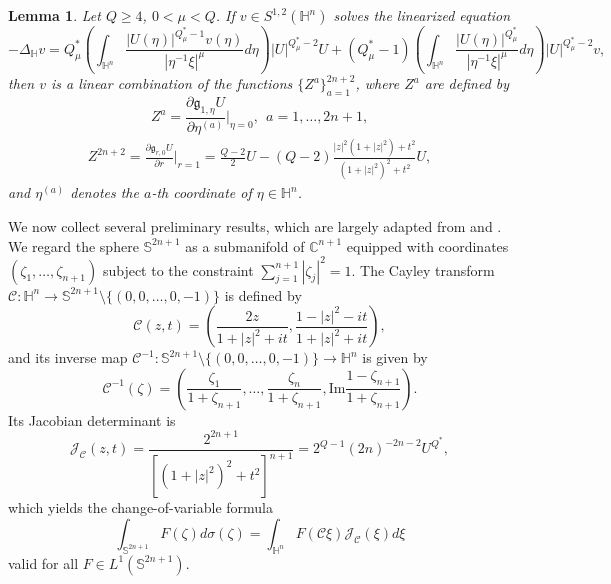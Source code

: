 \documentclass[10pt,a4paper]{amsart}
\newtheorem{lemma}{Lemma}[section]
\begin{document}
\begin{lemma}
 Let $Q\geq 4$, $0<\mu< Q$.
 {If $v \in S^{1,2}(\mathbb{H}^{n})$ solves the linearized equation}
 \begin{equation*}
 -\Delta_{\mathbb{H}} v=Q^{\ast}_{\mu}\left(\int_{\mathbb{H}^{n}}\frac{|U(\eta)|^{Q^{\ast}_{\mu}-1}v(\eta)}
{|\eta^{-1}\xi|^{\mu}}{d}\eta\right)|U|^{Q^{\ast}_{\mu}-2}U+(Q^{\ast}_{\mu}-1)
\left(\int_{\mathbb{H}^{n}}\frac{|U(\eta)|^{Q^{\ast}_{\mu}}}{|\eta^{-1}\xi|^{\mu}}{d}\eta\right)
|U|^{Q^{\ast}_{\mu}-2}v,
\end{equation*}
{then $v$ is a linear combination} of the functions $\{Z^{a}\}_{a=1}^{2n +2}$, where $Z^a$ are defined by
 \begin{equation*}
 Z^{a}=\frac{\partial \mathfrak{g}_{1, \eta}U }{\partial\eta^{(a)}}\bigg|_{ \eta=0},~~ a=1,\ldots, 2n+1,
 \end{equation*}
\begin{equation*}
\begin{aligned}
Z^{2n+2}= \frac{\partial \mathfrak{g}_{r, 0}U }{\partial r}\bigg|_{r=1}=
\frac{Q-2}{2}U-(Q-2)\frac{|z|^2(1+|z|^2)+t^2}{(1+|z|^2)^2+t^2} U,
\end{aligned}
\end{equation*}
and $\eta^{(a)}$ denotes the $a$-th coordinate of $\eta \in \mathbb{H}^n$.
\end{lemma}

We now collect several preliminary results, which are largely adapted from \cite[Section 5]{FL12} and \cite[Section 2]{YZ251}.
We regard the sphere $\mathbb{S}^{2n+1}$ as a submanifold of $\mathbb{C}^{n+1}$ equipped with coordinates
$(\zeta_1,\ldots,\zeta_{n+1})$ subject to the constraint $\sum\limits_{j=1}^{n+1}|\zeta_j|^2=1$.
 The Cayley transform $\mathcal{C}:\mathbb{H}^n \rightarrow \mathbb{S}^{2n+1}\setminus \{(0,0,\ldots,0,-1)\}$ is defined by
\begin{equation*}
 \mathcal{C}(z,t)=\left(\frac{2z}{1+|z|^2+it},\frac{1-|z|^2-it}{1+|z|^2+it}\right),
\end{equation*}
and its inverse map $\mathcal{C}^{-1}: \mathbb{S}^{2n+1}\setminus \{(0,0,\ldots,0,-1)\}\rightarrow \mathbb{H}^n$ is given by
\begin{equation*}
 \mathcal{C}^{-1}(\zeta)=\left(\frac{\zeta_1}{1+\zeta_{n+1}},\ldots,\frac{\zeta_n}{1+\zeta_{n+1}},\mathrm{Im}\frac{1-\zeta_{n+1}}{1+\zeta_{n+1}}\right).
\end{equation*}
{Its Jacobian determinant is}
\begin{equation*}
 \mathcal{J}_\mathcal{C}(z,t)=\frac{2^{2n+1}}{[(1+|z|^2)^2+t^2]^{n+1}}=2^{Q-1}(2n)^{-2n-2}U^{Q^{\ast}},
\end{equation*}
which yields the change-of-variable formula \[\int_{\mathbb{S}^{2n+1}}F(\zeta)d \sigma(\zeta)=\int_{\mathbb{H}^n}F(\mathcal{C}\xi) \mathcal{J}_\mathcal{C}(\xi) d \xi\]
valid for all $F\in L^1(\mathbb{S}^{2n+1})$.
\end{document}
